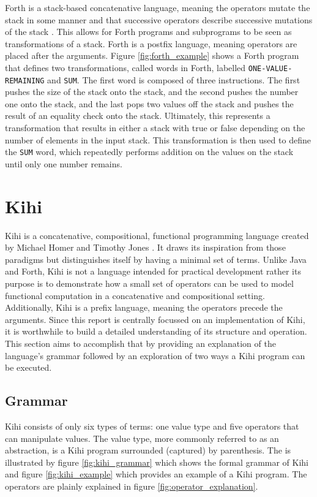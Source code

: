 Forth is a stack-based concatenative language, meaning the operators mutate the stack in some manner and that successive operators describe successive mutations of the stack \cite{WhatForthProgramming2019}. This allows for Forth programs and subprograms to be seen as transformations of a stack. Forth is a postfix language, meaning operators are placed after the arguments. Figure \ref{fig:forth_example} shows a Forth program that defines two transformations, called words in Forth, labelled \lstinline{ONE-VALUE-REMAINING} and \lstinline{SUM}. The first word is composed of three instructions. The first pushes the size of the stack onto the stack, and the second pushes the number one onto the stack, and the last pops two values off the stack and pushes the result of an equality check onto the stack. Ultimately, this represents a transformation that results in either a stack with true or false depending on the number of elements in the input stack. This transformation is then used to define the \lstinline{SUM} word, which repeatedly performs addition on the values on the stack until only one number remains.



\section{Kihi}
Kihi is a concatenative, compositional, functional programming language created by Michael Homer and Timothy Jones \cite{jones2018practice}. It draws its inspiration from those paradigms but distinguishes itself by having a minimal set of terms. Unlike Java and Forth, Kihi is not a language intended for practical development rather its purpose is to demonstrate how a small set of operators can be used to model functional computation in a concatenative and compositional setting. Additionally, Kihi is a prefix language, meaning the operators precede the arguments. Since this report is centrally focussed on an implementation of Kihi, it is worthwhile to build a detailed understanding of its structure and operation. This section aims to accomplish that by providing an explanation of the language's grammar followed by an exploration of two ways a Kihi program can be executed.




\subsection{Grammar}
Kihi consists of only six types of terms: one value type and five operators that can manipulate values. The value type, more commonly referred to as an abstraction, is a Kihi program surrounded (captured) by parenthesis. The is illustrated by figure \ref{fig:kihi_grammar} which shows the formal grammar of Kihi and figure \ref{fig:kihi_example} which provides an example of a Kihi program. The operators are plainly explained in figure \ref{fig:operator_explanation}.

